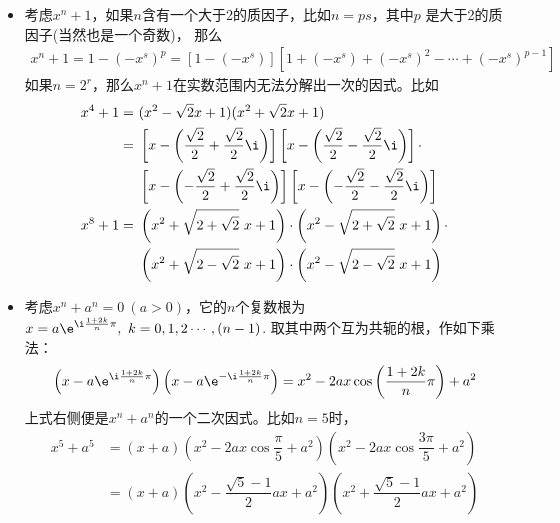 \begin{itemize}[leftmargin=\inteval{\myitemleftmargin}pt,itemsep=
   \inteval{\myitemitempsep}pt,topsep=\inteval{\myitemtopsep}pt]
\item 考虑$ x^n+1 $，如果$ n $含有一个大于2的质因子，比如$ n=ps $，其中$ p $
是大于2的质因子(当然也是一个奇数)，
那么
\begin{gather*}
    x^n+1=1-(-x^s)^p=[1-(-x^s)][1+(-x^s)+(-x^s)^2-\cdots +(-x^s)^{p-1}]
\end{gather*}
如果$ n=2^r $，那么$ x^n+1 $在实数范围内无法分解出一次的因式。比如
\begin{align*}
x^4+1 =&\  (x^2-\sqrt{2}x+1)(x^2+\sqrt{2}x+1)   \\
=&\  \left[x-\left(\dfrac{\sqrt{2}}{2}+\dfrac{\sqrt{2}}{2}\i \right)\right] 
\left[x-\left( \dfrac{\sqrt{2}}{2}-\dfrac{\sqrt{2}}{2}\i \right)\right]
\cdot \\
&\ \left[x-\left(-\dfrac{\sqrt{2}}{2}+\dfrac{\sqrt{2}}{2}\i \right)\right]
\left[x-\left(-\dfrac{\sqrt{2}}{2}-\dfrac{\sqrt{2}}{2}\i \right)\right]  \\
x^8+1 =&\  \left( x^2+\sqrt{2+\sqrt{2}}\ x+1\right) \cdot
\left( x^2-\sqrt{2+\sqrt{2}}\ x+1\right) \cdot \\
&\ \left( x^2+\sqrt{2-\sqrt{2}}\ x+1\right) \cdot
\left( x^2-\sqrt{2-\sqrt{2}}\ x+1\right)
\end{align*}

\item 考虑$ x^{n}+a^n=0\ (a>0) $，它的$ n $个复数根为
$ x=a\e^{\i\frac{1+2k}{n}\pi} ,\ k=0,1,2\cdots ,(n-1) $. 
取其中两个互为共轭的根，作如下乘法：
\begin{gather*}
    \left(x-a\e^{\i\frac{1+2k}{n}\pi}\right)
    \left(x-a\e^{-\i\frac{1+2k}{n}\pi}\right)=
    x^2-2ax\cos\left(\dfrac{1+2k}{n}\pi\right) +a^2    
\end{gather*}
上式右侧便是$ x^n+a^n $的一个二次因式。比如$ n=5 $时，
\begin{align*}
    x^5+a^5 &=(x+a)\left(x^2-2ax\cos\dfrac{\pi}{5}+a^2 \right)
    \left(x^2-2ax\cos\dfrac{3\pi}{5}+a^2 \right) \\
    &=(x+a)\left(x^2-\dfrac{\sqrt{5}-1}{2} ax+a^2 \right)
    \left(x^2+\dfrac{\sqrt{5}-1}{2} ax+a^2 \right)
\end{align*}


\end{itemize}
